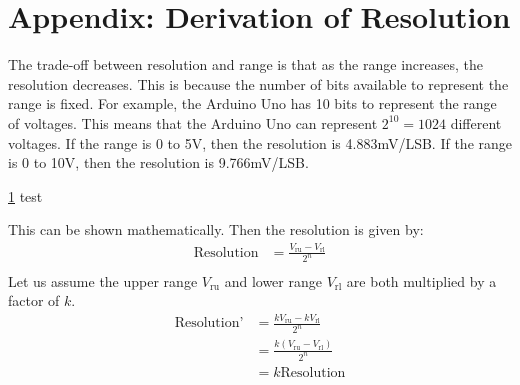 \section{Appendix: Derivation of Resolution}
\label{sec:appendix-resolution}
The trade-off between resolution and range is that as the range increases, the resolution decreases. This is because the number of bits
available to represent the range is fixed. For example, the Arduino Uno has 10 bits to represent the range of voltages. This means that the
Arduino Uno can represent $2^{10} = 1024$ different voltages. If the range is 0 to 5V, then the resolution is 4.883mV/LSB. If the range is
0 to 10V, then the resolution is 9.766mV/LSB. 

\ref{sec:appendix-resolution} test

This can be shown mathematically. Then the resolution is given by:
\[
\begin{aligned}
    \text{Resolution} &= \frac{V_{\text{ru}} - V_{\text{rl}}}{2^n} \\
\end{aligned}
\]
Let us assume the upper range $V_{\text{ru}}$ and lower range $V_{\text{rl}}$ are both multiplied by a factor of $k$.
\[
\begin{aligned}
    \text{Resolution'} &= \frac{kV_{\text{ru}} - kV_{\text{rl}}}{2^n} \\
    &= \frac{k(V_{\text{ru}} - V_{\text{rl}})}{2^n} \\
    &= k \text{Resolution} \\
\end{aligned}
\]